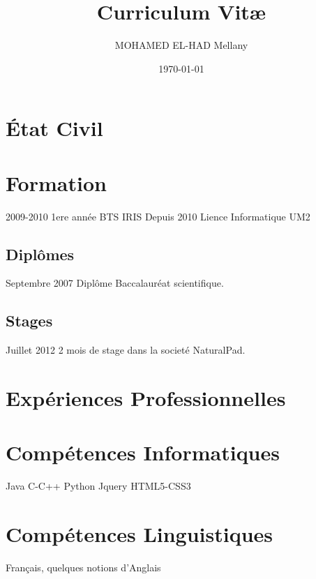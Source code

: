 \documentclass [a4paper]{article}
\title{Curriculum Vit\ae}
\author{MOHAMED EL-HAD Mellany}
\date{\today}
\begin{document}
\maketitle

\section{\'Etat Civil}

\section{Formation}
2009-2010	1ere année BTS IRIS
Depuis 2010	Lience Informatique UM2
\subsection{Diplômes}
Septembre 2007  Diplôme Baccalauréat scientifique.
\subsection{Stages}
Juillet 2012    2 mois de stage dans la societé NaturalPad.

\section{Expériences Professionnelles}

\section*{Compétences Informatiques}
Java
C-C++
Python
Jquery
HTML5-CSS3
\section*{Compétences Linguistiques}
Français, quelques notions d'Anglais
\end{document}
